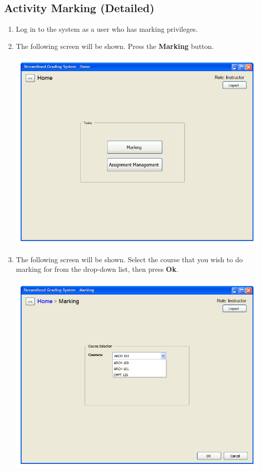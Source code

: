 \documentclass{article}
\begin{document}
\subsection{Activity Marking (Detailed)}
\begin{enumerate}
  \item Log in to the system as a user who has marking privileges.
  \item The following screen will be shown.  Press the \textbf{Marking} button.
  \begin{center} 
   \includegraphics[scale=0.55]{../images/UIMockups/pngs/LandingPage}
  \end{center}
  \item The following screen will be shown.  Select the course that you wish
    to do marking for from the drop-down list, then press \textbf{Ok}.
    \begin{center} 
     \includegraphics[scale=0.55]{../images/UIMockups/pngs/CourseSelectionM}

\end{center}
\end{enumerate}
\end{document}
